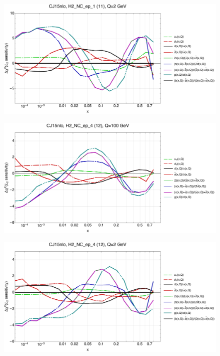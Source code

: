 \documentclass[10pt,aps,prd,floatfix,titlepage]{revtex4}
\begin{document}
\begin{figure}
\includegraphics[width=\textwidth,height=0.44\textheight,keepaspectratio]{2/11_CJ15nlo_q2_Sf_2.pdf}
\caption{}
\end{figure}
\clearpage
\begin{figure}
\includegraphics[width=\textwidth,height=0.44\textheight,keepaspectratio]{2/12_CJ15nlo_q100_Sf_2.pdf}
\caption{}
\end{figure}
\begin{figure}
\includegraphics[width=\textwidth,height=0.44\textheight,keepaspectratio]{2/12_CJ15nlo_q2_Sf_2.pdf}
\caption{}
\end{figure}
\end{document}
